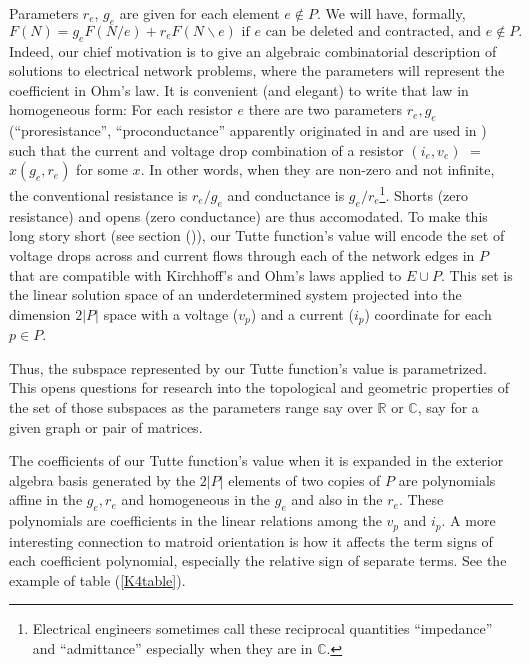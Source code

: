 \documentclass[Unicode]{cedram-alco}
\begin{document}
Parameters $r_e$, $g_e$ are given for each element $e\not\in P$. We
will have, formally,
\begin{equation}\label{ParamTutteEqGeneric}
   F(N) = g_eF(N/e)+r_eF(N\backslash e) \text{ if\ }e\text{ can be deleted and contracted, and }e\not\in P.
\end{equation}
Indeed, our chief motivation is to give an algebraic combinatorial description of solutions
to electrical network problems, where the parameters will represent the coefficient
in Ohm's law.  It is convenient (and elegant) to write that law in homogeneous form:
For each resistor $e$ there
are two parameters $r_e,g_e$
(``proresistance'', ``proconductance'' apparently originated in \cite{SmithElec} and are used in
\cite{TutteEx,CirThProjHomo2019}) such that the current and voltage drop
combination of a resistor $(i_e,v_e)$ $=$ $x(g_e,r_e)$ for some $x$.
In other words, when they
are non-zero and not infinite, the conventional
resistance is $r_e/g_e$ and conductance is $g_e/r_e$\footnote{Electrical engineers
sometimes call these reciprocal quantities ``impedance'' and ``admittance'' especially
when they are in $\mathbb{C}$.}. Shorts (zero resistance) and opens (zero
conductance) are thus accomodated.   To make this long story short (see section ()),
our Tutte function's value
will encode the set of voltage drops across and current flows through each of
the network edges in $P$ that are compatible with Kirchhoff's and Ohm's laws applied to $E\cup P$. This set
is the linear solution space of an underdetermined system projected into the
dimension $2|P|$ space with a voltage ($v_{p}$) and a current ($i_{p}$) coordinate for each $p\in P$.

Thus, the subspace represented by our Tutte function's value is parametrized.
This opens questions for research into the topological and geometric properties
of the set of those subspaces
as the parameters range say over
$\mathbb{R}$ or $\mathbb{C}$, say for a given graph or pair of
matrices.

The coefficients of our Tutte function's value when it is expanded
in the exterior algebra basis
generated by the $2|P|$ elements of two copies of $P$
are polynomials affine in the $g_e, r_e$
and homogeneous in the $g_e$ and also in the $r_e$.
These polynomials are coefficients in the
linear relations among the $v_p$ and $i_p$.
A more interesting connection to matroid orientation is how it
affects the term signs of each coefficient polynomial,
especially the relative sign of separate terms.
See the example of table (\ref{K4table}).
\end{document}
